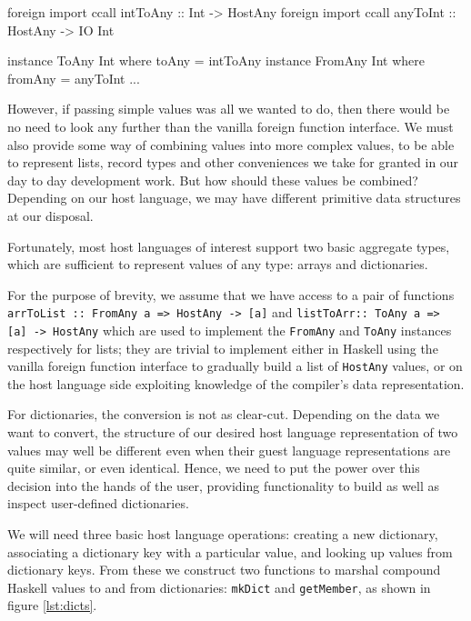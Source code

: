 \documentclass{sigplanconf}
\begin{document}
\begin{code}
  foreign import ccall intToAny :: Int -> HostAny
  foreign import ccall anyToInt :: HostAny -> IO Int

  instance ToAny Int where toAny = intToAny
  instance FromAny Int where fromAny = anyToInt
  ...
\end{code}

However, if passing simple values was all we wanted to do, then there would be
no need to look any further than the vanilla foreign function interface.
We must also provide some way of combining values into more complex values,
to be able to represent lists, record types and other conveniences we take for
granted in our day to day development work.
But how should these values be combined? Depending on our host language, we
may have different primitive data structures at our disposal.

Fortunately, most host languages of interest support two basic aggregate types,
which are sufficient to represent values of any type: arrays and dictionaries.

For the purpose of brevity, we assume that we have
access to a pair of functions
\lstinline!arrToList :: FromAny a => HostAny -> [a]!
and \lstinline!listToArr:: ToAny a => [a] -> HostAny!
which are used to implement the \lstinline!FromAny! and \lstinline!ToAny!
instances respectively for lists;
they are trivial to implement either in Haskell using the vanilla foreign
function interface to gradually build a list of \lstinline!HostAny! values,
or on the host language side exploiting knowledge of the compiler's
data representation.

For dictionaries, the conversion is not as clear-cut. Depending on the data
we want to convert, the structure of our desired host language representation
of two values may well be different even when their guest language
representations are quite similar, or even identical.
Hence, we need to put the power over this decision into the hands of the user,
providing functionality to build as well as inspect user-defined dictionaries.

We will need three basic host language operations: creating a new dictionary,
associating a dictionary key with a particular value, and looking up values
from dictionary keys. From these we construct two functions to marshal compound
Haskell values to and from dictionaries: \lstinline!mkDict!
and \lstinline!getMember!, as shown in figure \ref{lst:dicts}.
\end{document}
